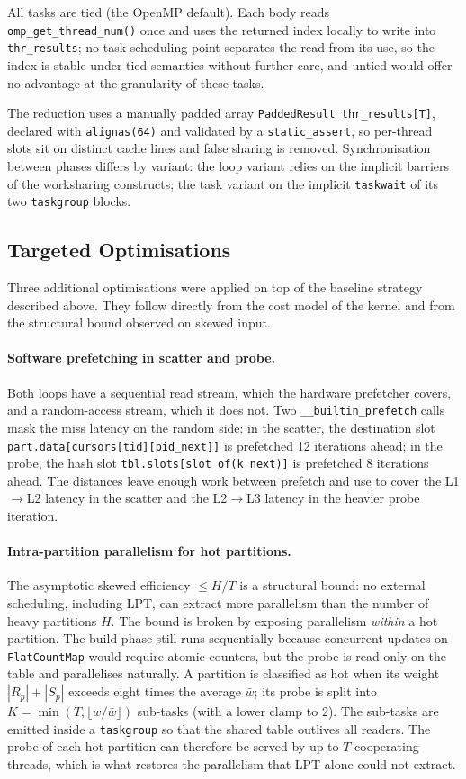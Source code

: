 \documentclass[10pt,twocolumn,a4paper]{article}
\begin{document}
All tasks are tied (the OpenMP default). Each body reads
\texttt{omp\_get\_thread\_num()} once and uses the returned index
locally to write into \texttt{thr\_results}; no task scheduling
point separates the read from its use, so the index is stable
under tied semantics without further care, and untied would offer
no advantage at the granularity of these tasks.

The reduction uses a manually padded array
\texttt{PaddedResult thr\_results[T]}, declared with
\texttt{alignas(64)} and validated by a \texttt{static\_assert}, so
per-thread slots sit on distinct cache lines and false sharing is
removed. Synchronisation between phases differs by variant: the loop
variant relies on the implicit barriers of the worksharing
constructs; the task variant on the implicit \texttt{taskwait} of
its two \texttt{taskgroup} blocks.

\subsection{Targeted Optimisations}\label{sec:opt}
Three additional optimisations were applied on top of the baseline
strategy described above. They follow directly from the cost model of
the kernel and from the structural bound observed on skewed input.

\paragraph{Software prefetching in scatter and probe.}
Both loops have a sequential read stream, which the hardware
prefetcher covers, and a random-access stream, which it does not.
Two \texttt{\_\_builtin\_prefetch} calls mask the miss latency on
the random side: in the scatter, the destination slot
\texttt{part.data[cursors[tid][pid\_next]]} is prefetched 12
iterations ahead; in the probe, the hash slot
\texttt{tbl.slots[slot\_of(k\_next)]} is prefetched 8 iterations
ahead. The distances leave enough work between prefetch and use to
cover the L1$\to$L2 latency in the scatter and the L2$\to$L3
latency in the heavier probe iteration.

\paragraph{Intra-partition parallelism for hot partitions.}
The asymptotic skewed efficiency $\le H/T$ is a structural bound: no
external scheduling, including LPT, can extract more parallelism than
the number of heavy partitions $H$. The bound is broken by exposing
parallelism \emph{within} a hot partition. The build phase still runs
sequentially because concurrent updates on \texttt{FlatCountMap} would
require atomic counters, but the probe is read-only on the table and
parallelises naturally. A partition is classified as hot when its
weight $|R_p| + |S_p|$ exceeds eight times the average $\bar{w}$;
its probe is split into $K = \min(T, \lfloor w/\bar{w}\rfloor)$
sub-tasks (with a lower clamp to $2$). The sub-tasks are
emitted inside a \texttt{taskgroup} so that the shared table outlives
all readers. The probe of each hot partition can therefore be served
by up to $T$ cooperating threads, which is what restores the
parallelism that LPT alone could not extract.
\end{document}
